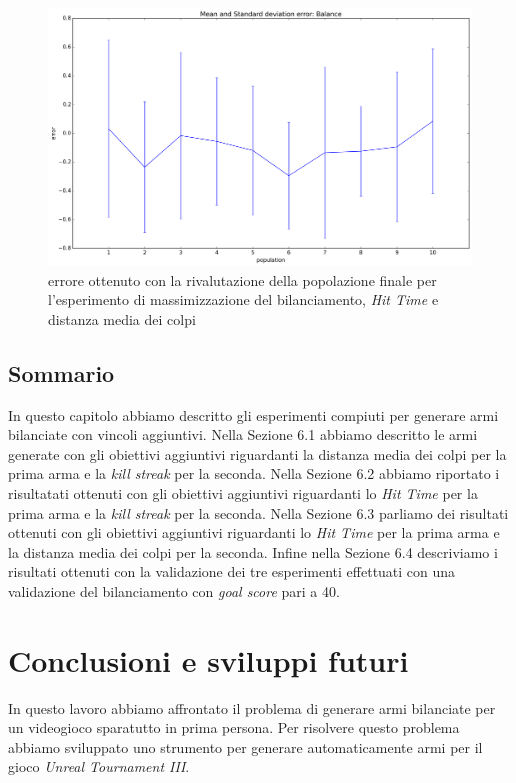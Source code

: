 \documentclass[12pt, italian]{toptesi}
\begin{document}
\begin{figure}[tp]
\centering
\includegraphics[width=1.0\textwidth]{error_delta_dist}
\caption{errore ottenuto con la rivalutazione della popolazione finale per l'esperimento di massimizzazione del bilanciamento, \emph{Hit Time} e distanza media dei colpi}
\label{fig:error_delta_dist}
\end{figure}

\section{Sommario}
In questo capitolo abbiamo descritto gli esperimenti compiuti per generare armi bilanciate con vincoli aggiuntivi.
Nella Sezione 6.1 abbiamo descritto le armi generate con gli obiettivi aggiuntivi riguardanti la distanza media dei colpi per la prima arma e la \emph{kill streak} per la seconda.
Nella Sezione 6.2 abbiamo riportato i risultatati ottenuti con gli obiettivi aggiuntivi riguardanti lo \emph{Hit Time} per la prima arma e la \emph{kill streak} per la seconda.
Nella Sezione 6.3 parliamo dei risultati ottenuti con gli obiettivi aggiuntivi riguardanti lo \emph{Hit Time} per la prima arma e la distanza media dei colpi per la seconda.
Infine nella Sezione 6.4 descriviamo i risultati ottenuti con la validazione dei tre esperimenti effettuati con una validazione del bilanciamento con \emph{goal score} pari a 40.


 
\chapter{Conclusioni e sviluppi futuri}

In questo lavoro abbiamo affrontato il problema di generare armi bilanciate per un videogioco sparatutto in prima persona.
Per risolvere questo problema abbiamo sviluppato uno strumento per generare automaticamente armi per il gioco \emph{Unreal Tournament III}.
\end{document}
